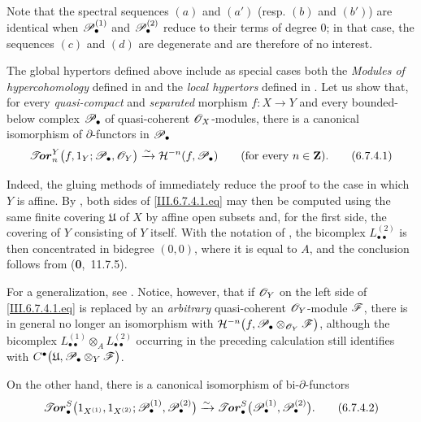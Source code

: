 Note that the spectral sequences
$(a)$ and $(a')$ (resp. $(b)$ and $(b')$) are identical when
$\mathscr{P}_\bullet^{(1)}$ and $\mathscr{P}_\bullet^{(2)}$ reduce to their terms
of degree $0$; in that case, the sequences $(c)$ and
$(d)$ are degenerate and are therefore of no
interest.

\begin{remark}[6.7.4]
\label{III.6.7.4}
The global hypertors defined above include as special cases both
the \emph{Modules of hypercohomology} defined in  and the
\emph{local hypertors} defined in .  Let us show that, for every
\emph{quasi-compact} and \emph{separated} morphism $f:X\to Y$ and every
bounded-below complex $\mathscr{P}_\bullet$ of quasi-coherent
$\mathscr{O}_X$-modules, there is a canonical isomorphism of
$\partial$-functors in $\mathscr{P}_\bullet$
\[
  \boldsymbol{\mathscr{T}\!or}_n^Y
  \bigl(
    f,1_Y;
    \mathscr{P}_\bullet,\mathscr{O}_Y
  \bigr)
  \xrightarrow{\sim}
  \mathcal{H}^{-n}(f,\mathscr{P}_\bullet)
  \qquad\text{(for every $n\in\mathbf Z$)}.
  \tag{6.7.4.1}\label{III.6.7.4.1.eq}
\]

Indeed, the gluing methods of  immediately reduce the
proof to the case in which $Y$ is affine.  By
, both sides of
\eqref{III.6.7.4.1.eq} may then be computed using the same
finite covering $\mathfrak U$ of $X$ by affine open subsets and,
for the first side, the covering of $Y$ consisting of $Y$
itself.  With the notation of , the bicomplex
$L_{\bullet\bullet}^{(2)}$ is then concentrated in bidegree
$(0,0)$, where it is equal to $A$, and the conclusion follows
from (\textbf{0},~11.7.5).

For a generalization, see .  Notice, however,
that if $\mathscr{O}_Y$ on the left side of
\eqref{III.6.7.4.1.eq} is replaced by an \emph{arbitrary}
quasi-coherent $\mathscr{O}_Y$-module $\mathscr{F}$, there is in general no
longer an isomorphism with $\mathcal{H}^{-n}
\bigl(
f,\mathscr{P}_\bullet\otimes_{\mathscr{O}_Y}\mathscr{F}
\bigr)$,
although the bicomplex
$L_{\bullet\bullet}^{(1)}\otimes_A
 L_{\bullet\bullet}^{(2)}$ occurring in the preceding
calculation still identifies with $C^\bullet
\bigl(
\mathfrak U,
\mathscr{P}_\bullet\otimes_Y\mathscr{F}
\bigr)$.

On the other hand, there is a canonical isomorphism of
bi-$\partial$-functors
\[
  \boldsymbol{\mathscr{T}\!or}_\bullet^S
  \bigl(
    1_{X^{(1)}},1_{X^{(2)}};
    \mathscr{P}_\bullet^{(1)},\mathscr{P}_\bullet^{(2)}
  \bigr)
  \xrightarrow{\sim}
  \boldsymbol{\mathscr{T}\!\mathit{or}}_\bullet^S
  \bigl(
    \mathscr{P}_\bullet^{(1)},\mathscr{P}_\bullet^{(2)}
  \bigr).
  \tag{6.7.4.2}\label{III.6.7.4.2.eq}
\]


\end{remark}
